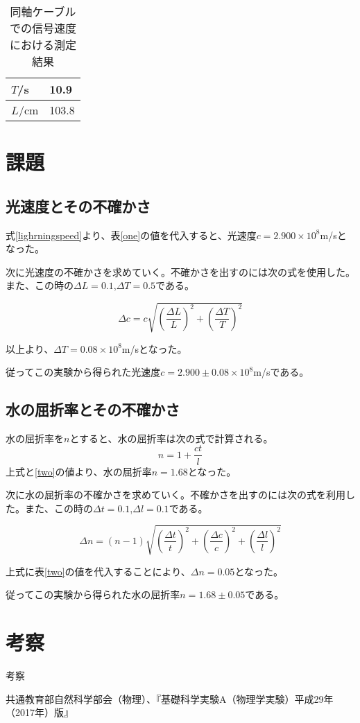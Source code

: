 \documentclass{jsarticle}
\begin{document}
\begin{table}[H]
\centering
\caption{同軸ケーブルでの信号速度における測定結果}
\label{three}
\begin{tabular}{|l|l|}
\hline
$T$/s  & 10.9  \\ \hline
$L$/cm & 103.8 \\ \hline
\end{tabular}
\end{table}


\section{課題}

\subsection{光速度とその不確かさ}
式\ref{lighrningspeed}より、表\ref{one}の値を代入すると、光速度$c = 2.900 \times 10^8$m/sとなった。\\
\par 次に光速度の不確かさを求めていく。不確かさを出すのには次の式を使用した。また、この時の$\Delta L = 0.1$,$\Delta T = 0.5$である。

\begin{equation}
    \Delta c = c\sqrt{(\frac{\Delta L}{L})^2 + (\frac{\Delta T}{T})^2}
\end{equation}

以上より、$\Delta T = 0.08 \times 10^8$m/sとなった。

従ってこの実験から得られた光速度$c = 2.900 \pm 0.08 \times 10^8$m/sである。




\subsection{水の屈折率とその不確かさ}
水の屈折率を$n$とすると、水の屈折率は次の式で計算される。
\begin{equation}
    n = 1 + \frac{ct}{l}
\end{equation}
上式と\ref{two}の値より、水の屈折率$n = 1.68$となった。\\
\par 次に水の屈折率の不確かさを求めていく。不確かさを出すのには次の式を利用した。また、この時の$\Delta t = 0.1$,$\Delta l = 0.1$である。

\begin{equation}
    \Delta n = (n-1)\sqrt{(\frac{\Delta t}{t})^2 + (\frac{\Delta c}{c})^2 + (\frac{\Delta l}{l})^2}
\end{equation}

上式に表\ref{two}の値を代入することにより、$\Delta n = 0.05$となった。

従ってこの実験から得られた水の屈折率$n = 1.68 \pm 0.05$である。



\section{考察}

考察






\begin{thebibliography}{99}
     共通教育部自然科学部会（物理）、『基礎科学実験A（物理学実験）平成29年（2017年）版』
\end{thebibliography}
\end{document}
